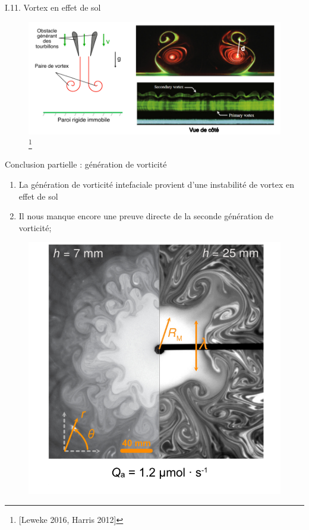 \documentclass[aspectratio=169,10pt]{beamer}
\begin{document}
\begin{frame}{I.11. Vortex en effet de sol}
  \vspace{-.5cm}
  \begin{figure}[t]
      \centering
      \includegraphics[scale=.9]{./figures/VortexInGroundEffect_vf_n1.pdf}\footnote{[Leweke 2016, Harris 2012]}
  \end{figure}
\end{frame}




\begin{frame}{Conclusion partielle : génération de vorticité}
    \begin{enumerate}
        \item La génération de vorticité intefaciale provient d'une instabilité de vortex en effet de sol
        \item Il nous manque encore une preuve directe de la seconde génération de vorticité;
        \end{enumerate}
        \begin{figure}
            \centering
            \includegraphics[width = .4\textwidth]{./figures/Marangoni_flow_emulsion_Qa1p2mumolL_h7mm_h25mm.png}
        \end{figure} 
\end{frame}
\end{document}
